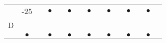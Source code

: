 \documentclass[landscape]{foils}
\begin{document}
{\begin{center}
\begin{tabular}{lclclclclclclcl}
   & -25      &    & {\color{black} $\bullet$}        &    & {\color{black}$\bullet$} &    & {\color{black}$\bullet$}&    & {\color{black}$\bullet$}&    & {\color{black}$\bullet$}&    & {\color{black}$\bullet$} \\
D  & {\color{black} $$} &     & {\color{black} $$ } &     & {\color{black} $$ } & {\color{black} $$} &     & {\color{black} $$ } &     & {\color{black} $$ } & {\color{black} $$} &     & {\color{black} $$ } &       \\
 & {\color{black} $\bullet$}      &    & {\color{black} $\bullet$}        &    & {\color{black}$\bullet$} &    & {\color{black}$\bullet$}&    & {\color{black}$\bullet$}&    & {\color{black}$\bullet$}&    & {\color{black}$\bullet$} \\
\end{tabular}
\end{center}
}
\end{document}
